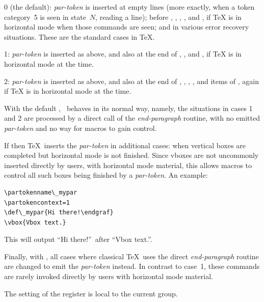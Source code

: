 \documentclass{pdftexmanual}
\begin{document}
0 (the default): {\em par-token} is inserted at empty lines (more
   exactly, when a token category~5 is seen in state~$N$, reading a
   line); before , , , , and
   , if \TeX{} is in horizontal mode when those commands are
   seen; and in various error recovery situations. These are the
   standard cases in \TeX.

1: {\em par-token} is inserted as above, and also at the end of
   , , and , if \TeX{} is in
   horizontal mode at the time.

2: {\em par-token} is inserted as above, and also at the end of
  , , , , and
  items of , again if \TeX{} is in horizontal mode at the
  time.

With the default , \TEX\ behaves in its normal
way, namely, the situations in cases 1 and 2 are processed by a direct
call of the {\em end-paragraph} routine, with no emitted {\em
par-token} and no way for macros to gain control.

If  then \TeX\ inserts the {\em par-token} in
additional cases: when vertical boxes are completed but horizontal mode
is not finished. Since vboxes are not uncommonly inserted directly by
users, with horizontal mode material, this allows macros to control all
such boxes being finished by a {\em par-token}. An example:

\begin{verbatim}
\partokenname\_mypar
\partokencontext=1
\def\_mypar{Hi there!\endgraf}
\vbox{Vbox text.}
\end{verbatim}

This will output ``Hi there!''\ after ``Vbox text.''.

Finally, with , all cases where classical \TeX\
uses the direct {\em end-paragraph} routine are changed to emit the {\em
par-token} instead. In contrast to case~1, these commands are rarely
invoked directly by users with horizontal mode material.

The setting of the register  is local to the current
group.


\subsection{}
\end{document}
